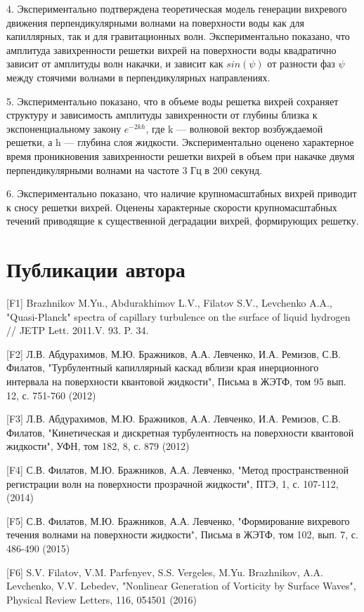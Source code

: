 4. Экспериментально подтверждена теоретическая модель генерации вихревого движения перпендикулярными волнами на поверхности воды как для капиллярных, так и для гравитационных волн. Экспериментально показано, что амплитуда завихренности решетки вихрей на поверхности воды квадратично зависит от амплитуды волн накачки, и зависит как $sin(\psi)$ от разности фаз $\psi$ между стоячими волнами в перпендикулярных направлениях. 

5. Экспериментально показано, что в объеме воды решетка вихрей сохраняет структуру и зависимость амплитуды завихренности от глубины близка к экспоненциальному закону $e^{-2kh}$, где k — волновой вектор возбуждаемой решетки, а h — глубина слоя жидкости. 
Экспериментально оценено характерное время проникновения завихренности решетки вихрей в объем при накачке двумя перпендикулярными волнами на частоте 3 Гц в 200 секунд.

6. Экспериментально показано, что наличие крупномасштабных вихрей приводит к сносу решетки вихрей. Оценены характерные скорости крупномасштабных течений приводящие к существенной деградации вихрей, формирующих решетку.


\clearpage 
\chapter*{Публикации автора}	%
%
%
[F1] Brazhnikov M.Yu., Abdurakhimov L.V., Filatov S.V., Levchenko A.A., "Quasi-Planck"{} spectra of capillary turbulence on the surface of liquid hydrogen // JETP Lett. 2011.V. 93. P. 34.

[F2] Л.В. Абдурахимов, М.Ю. Бражников, А.А. Левченко, И.А. Ремизов, С.В. Филатов, "Турбулентный капиллярный каскад вблизи края инерционного интервала на поверхности квантовой жидкости"{}, Письма в ЖЭТФ, том 95 вып. 12, с. 751-760 (2012)

[F3] Л.В. Абдурахимов, М.Ю. Бражников, А.А. Левченко, И.А. Ремизов, С.В. Филатов, "Кинетическая и дискретная турбулентность на поверхности квантовой жидкости"{}, УФН, том 182, 8, с. 879 (2012)

[F4] С.В. Филатов, М.Ю. Бражников, А.А. Левченко, "Метод пространственной регистрации волн на поверхности прозрачной жидкости"{}, ПТЭ, 1, с. 107-112, (2014)

[F5] С.В. Филатов, М.Ю. Бражников, А.А. Левченко, "Формирование вихревого течения волнами на поверхности жидкости"{}, Письма в ЖЭТФ, том 102, вып. 7, с. 486-490 (2015)

[F6] S.V. Filatov, V.M. Parfenyev, S.S. Vergeles, M.Yu. Brazhnikov, A.A. Levchenko, V.V. Lebedev, "Nonlinear Generation of Vorticity by Surface Waves"{}, Physical Review Letters, 116, 054501 (2016)

